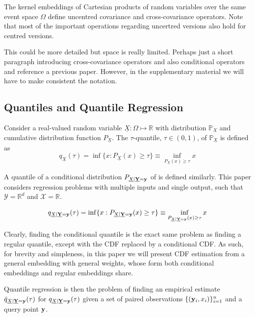 \documentclass[twoside]{article} \usepackage{aistats2017}
\theoremstyle{definition}
\theoremstyle{remark}
\newcommand{\rv}[1]{\underline{#1}}
\newcommand{\warn}[1]{{\color{RedOrange} #1}}
\newcommand{\extra}[1]{{\color{ForestGreen} #1}}
\begin{document}
		\extra{The kernel embeddings of Cartesian products of random variables over the same event space $\Omega$ define uncentred covariance and cross-covariance operators. Note that most of the important operations regarding uncertred versions also hold for centred versions.}
		 
		\warn{This could be more detailed but space is really limited. Perhaps just a short paragraph introducing cross-covariance operators and also conditional operators and reference a previous paper. However, in the supplementary material we will have to make consistent the notation.}
		
	\subsection{Quantiles and Quantile Regression}
	\label{sec:background:quantiles}

		Consider a real-valued random variable $\rv{X} : \Omega \mapsto \mathbb{R}$ with distribution $\mathbb{P}_{X}$ and cumulative distribution function $P_{\rv{X}}$. The $\tau$-quantile, $\tau \in (0, 1)$, of $\mathbb{P}_{\rv{X}}$ is defined as
		\begin{equation}
			q_{\rv{X}}(\tau) = \inf\{x : P_{\rv{X}}(x) \geq \tau\} \equiv \inf_{P_{\rv{X}}(x) \geq \tau} x
		\label{eq:quantile}
		\end{equation}
		
		A quantile of a conditional distribution $P_{\rv{X} | \bvec{\rv{Y}} = \bvec{y}}$ of is defined similarly. This paper considers regression problems with multiple inputs and single output, such that $\mathcal{Y} = \mathbb{R}^{d}$ and $\mathcal{X} = \mathbb{R}$.
		
		\begin{equation}
			q_{\rv{X} | \bvec{\rv{Y}} = \bvec{y}}(\tau) = \inf\{x : P_{\rv{X} | \bvec{\rv{Y}} = \bvec{y}}(x) \geq \tau\} \equiv \inf_{P_{\rv{X} | \bvec{\rv{Y}} = \bvec{y}}(x) \geq \tau} x
		\label{eq:conditional_quantile}
		\end{equation}
		
		Clearly, finding the conditional quantile is the exact same problem as finding a regular quantile, except with the CDF replaced by a conditional CDF. As such, for brevity and simpleness, in this paper we will present CDF estimation from a general embedding with general weights, whose form both conditional embeddings and regular embeddings share.
		
		Quantile regression is then the problem of finding an empirical estimate $\hat{q}_{\rv{X} | \bvec{\rv{Y}} = \bvec{y}}(\tau)$ for $q_{\rv{X} | \bvec{\rv{Y}} = \bvec{y}}(\tau)$ given a set of paired observations $\{(\mathbf{y}_{i}, x_{i})\}_{i = 1}^{n}$ and a query point $\mathbf{y}$.
		
\end{document}
